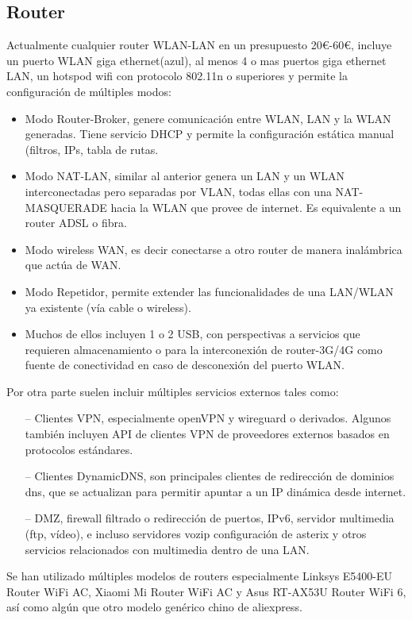 \subsection{Router}
Actualmente cualquier router WLAN-LAN en un presupuesto 20€-60€, incluye un puerto WLAN giga ethernet(azul), al menos 4 o mas puertos giga ethernet LAN, un hotspod wifi con protocolo 802.11n o superiores y permite la configuración de múltiples modos:
\begin{itemize}
    \item Modo Router-Broker, genere comunicación entre WLAN, LAN y la WLAN generadas. Tiene servicio DHCP y permite la configuración estática manual (filtros, IPs, tabla de rutas.
    \item Modo NAT-LAN, similar al anterior genera un LAN y un WLAN interconectadas pero separadas por VLAN, todas ellas con una NAT-MASQUERADE hacia la WLAN que provee de internet. Es equivalente a un router ADSL o fibra.
    \item Modo wireless WAN, es decir conectarse a otro router de manera inalámbrica que actúa de WAN.
    \item Modo Repetidor, permite extender las funcionalidades de una LAN/WLAN ya existente (vía cable o wireless).
    \item Muchos de ellos incluyen 1 o 2 USB, con perspectivas a servicios que requieren almacenamiento o para la interconexión de router-3G/4G como fuente de conectividad en caso de desconexión del puerto WLAN.
\end{itemize}

Por otra parte suelen incluir múltiples servicios externos tales como:
\begin{itemize}
    \item[--] Clientes VPN, especialmente openVPN y wireguard o derivados. Algunos también incluyen API de clientes VPN de proveedores externos basados en protocolos estándares.
    \item[--] Clientes DynamicDNS, son principales clientes de redirección de dominios dns, que se actualizan para permitir apuntar a un IP dinámica desde internet.
    \item[--] DMZ, firewall filtrado o redirección de puertos, IPv6, servidor multimedia (ftp, vídeo), e incluso servidores vozip configuración de asterix y otros servicios relacionados con multimedia dentro de una LAN.
\end{itemize}

Se han utilizado múltiples modelos de routers especialmente Linksys E5400-EU Router WiFi AC, Xiaomi Mi Router WiFi AC y Asus RT-AX53U Router WiFi 6, así como algún que otro modelo genérico chino de aliexpress.

